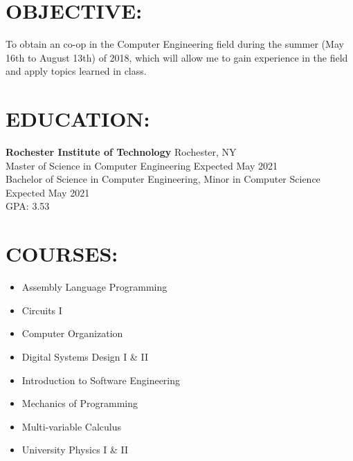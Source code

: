 \documentclass[line,margin]{res}
\begin{document}
\setlength\columnsep{-30pt}
\email{} %
\phone{} %
\address{} %
\address{} %
\website{} %

\begin{resume}
 \setlength
 \multicolsep{2pt}

\section{OBJECTIVE:} %
	To obtain an co-op in the Computer Engineering field during the summer (May 16th to August 13th) of 2018, which will allow me to gain experience in the field and apply topics learned in class.

\section{EDUCATION:} 
	\textbf{Rochester Institute of Technology} \hfill Rochester, NY \\
	Master of Science in Computer Engineering \hfill Expected May 2021 \\
	Bachelor of Science in Computer Engineering, Minor in Computer Science \hfill Expected May 2021\\ 
	GPA: 3.53

\section{COURSES:}
		\begin{multicols}{2}
		\setlength\columnsep{1pt}
			\begin{itemize}
				\setlength{\itemindent}{-25pt}
				\item[] Assembly Language Programming
				\item[] Circuits I
				\item[] Computer Organization
				\item[] Digital Systems Design I \& II
				\item[] \hspace{12.5pt} Introduction to Software Engineering
				\item[] \hspace{12.5pt} Mechanics of Programming
				\item[] \hspace{12.5pt} Multi-variable Calculus
				\item[] \hspace{12.5pt} University Physics I \& II
			\end{itemize}
		\end{multicols}


\end{resume}
\end{document}
